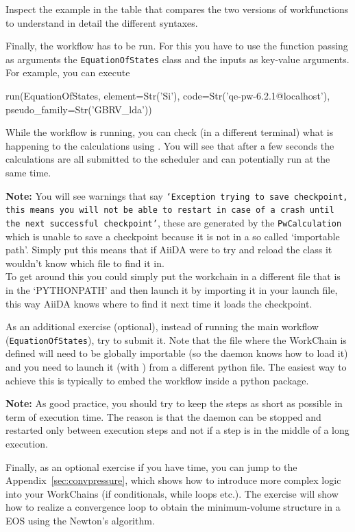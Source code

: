 Inspect the example in the table that compares the two versions of workfunctions to understand in detail the different syntaxes.

Finally, the workflow has to be run. For this you have to use the function  passing as arguments the \texttt{EquationOfStates} class and the inputs as key-value arguments. For example, you can execute

\begin{pythoncommand}
 run(EquationOfStates, element=Str('Si'), code=Str('qe-pw-6.2.1@localhost'),
     pseudo_family=Str('GBRV_lda'))
\end{pythoncommand}

While the workflow is running, you can check (in a different terminal) what is happening
to the calculations using . You will see that after a few seconds the calculations are all submitted to the scheduler and can potentially run at the same time.

\begin{tcolorbox}
\textbf{Note:}
You will see warnings that say \texttt{`Exception trying to save checkpoint, this means you will not be able to restart in case of a crash until the next successful checkpoint'}, these are generated by the \texttt{PwCalculation} which is unable to save a checkpoint because it is not in a so called `importable path'.  Simply put this means that if AiiDA were to try and reload the class it wouldn't know which file to find it in.\\
To get around this you could simply put the workchain in a different file that is in the `PYTHONPATH' and then launch it by importing it in your launch file, this way AiiDA knows where to find it next time it loads the checkpoint.
\end{tcolorbox}

As an additional exercise (optional), instead of running the main workflow (\texttt{EquationOfStates}),
try to submit it. Note that the file where the WorkChain is defined will need to be globally importable (so the daemon knows how to load it) and you need to launch it (with ) from a different python file. The easiest way to achieve this is typically to embed the workflow inside a python package.

\begin{tcolorbox}
\textbf{Note:} 
As good practice, you should try to keep the steps as short as possible in term of execution time. The reason is that the daemon can be stopped and restarted only between execution steps and not if a step is in the middle of a long execution.
\end{tcolorbox}

Finally, as an optional exercise if you have time, you can jump to the Appendix~\ref{sec:convpressure}, which shows how to introduce more complex logic into your WorkChains (if conditionals, while loops etc.). The exercise will show how to realize a convergence loop to obtain the minimum-volume structure in a EOS using the Newton's algorithm.
